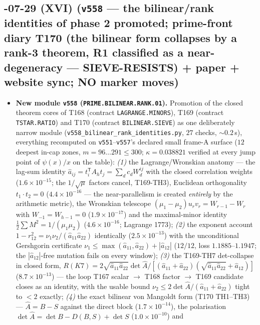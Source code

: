 \documentclass[11pt]{article}
\begin{document}
\subsection*{-07-29 (XVI) (\texttt{v558} --- the bilinear/rank identities of phase 2 promoted; prime-front diary T170 (the bilinear form collapses by a rank-3 theorem, R1 classified as a near-degeneracy --- SIEVE-RESISTS) + paper + website sync; NO marker moves)}
\begin{itemize}[leftmargin=1.5em]
\item \textbf{New module \texttt{v558} (\texttt{PRIME.BILINEAR.RANK.01}).} Promotion of
the closed theorem cores of T168 (contract \texttt{LAGRANGE.MINORS}), T169 (contract
\texttt{TSTAR.RATIO}) and T170 (contract \texttt{BILINEAR.SIEVE}) as one deliberately
narrow module (\texttt{v558\_bilinear\_rank\_identities.py}, $27$ checks,
${\sim}0.2$\,s), everything recomputed on \texttt{v551}--\texttt{v557}'s declared small
frame-A surface ($12$ deepest in-cap zones, $m=96\ldots291\le300$; $\kappa=0.038821$
verified at every jump point of $\psi(x)/x$ on the table): \emph{(1)} the
Lagrange/Wronskian anatomy --- the lag-sum identity $\hat a_{ij}=t_i^{\mathsf T}A_ht_j
=\sum_d c_dW^{ij}_d$ with the closed correlation weights ($1.6\times10^{-15}$; the
$1/\sqrt{\mu}$ factors cancel, T169-TH3), Euclidean orthogonality $t_1\cdot t_2=0$
($4.4\times10^{-16}$ --- the near-parallelism is created \emph{entirely} by the
arithmetic metric), the Wronskian telescope $(\mu_1-\mu_2)u_rv_r=W_{r-1}-W_r$ with
$W_{-1}=W_{h-1}=0$ ($1.9\times10^{-17}$) and the maximal-minor identity
$\tfrac12\sum M^2=1/(\mu_1\mu_2)$ ($4.6\times10^{-16}$; Lagrange 1773); \emph{(2)} the
exponent account $1-r_{12}^2=\nu_1\nu_2/(\hat a_{11}\hat a_{22})$ identically
($2.5\times10^{-13}$) with the unconditional Gershgorin certificate
$\nu_1\le\max(\hat a_{11},\hat a_{22})+|\hat a_{12}|$ ($12/12$, loss
$1.1885$--$1.1947$; the $|\hat a_{12}|$-free mutation fails on every window);
\emph{(3)} the T169-TH7 det-collapse in closed form,
$R(K7)=2\sqrt{\hat a_{11}\hat a_{22}}\det\hat A/[(\hat a_{11}+\hat a_{22})
(\sqrt{\hat a_{11}\hat a_{22}}+\hat a_{12})]$ ($8.7\times10^{-13}$) --- the loop
T167 scalar $\to$ T168 factor $\to$ T169 candidate closes as an identity, with the
usable bound $\nu_2\le2\det\hat A/(\hat a_{11}+\hat a_{22})$ tight to $<2$ exactly;
\emph{(4)} the exact bilinear von Mangoldt form (T170 TH1--TH3) --- $\hat A=B-S$
against the direct block ($1.7\times10^{-14}$), the polarisation
$\det\hat A=\det B-D(B,S)+\det S$ ($1.0\times10^{-10}$) and

\end{itemize}
\end{document}
